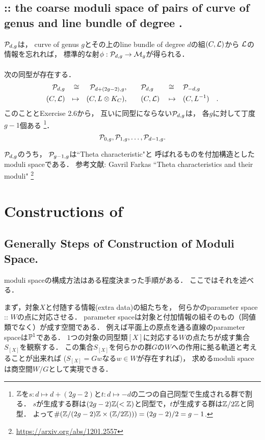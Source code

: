 \documentclass[a4paper]{jsarticle}
\begin{document}
    \subsection{
        :: the coarse moduli space of pairs of curve of genus  and line bundle of degree . }
    $\mathcal{P}_{d,g}$は，
    curve of genus $g$とその上のline bundle of degree $d$の組$(C, \mathcal{L})$から
    $\mathcal{L}$の情報を忘れれば，
    標準的な射$\phi: \mathcal{P}_{d,g} \to \mathcal{M}_g$が得られる．

    \paragraph{}
    次の同型が存在する．
    \[
    \begin{aligned}
        \mathcal{P}_{d,g}& &\cong& &\mathcal{P}_{d+(2g-2), g},&
        && \quad
        \mathcal{P}_{d,g}& &\cong& &\mathcal{P}_{-d, g}& \\
        (C, \mathcal{L})& &\mapsto& &(C, L \otimes K_C),&
        && \quad
        (C, \mathcal{L})& &\mapsto& &(C, L^{-1})&.
    \end{aligned}
    \]
    このこととExercise 2.6から，
    互いに同型にならない$\mathcal{P}_{d,g}$は，
    各$g$に対して丁度$g-1$個ある
    \footnote
    {
        $\mathbb{Z}$を$s: d \mapsto d+(2g-2)$と$t: d \mapsto -d$の二つの自己同型で生成される群で割る．
        $s$が生成する群は$(2g-2)\mathbb{Z} (< \mathbb{Z})$と同型で，$t$が生成する群は$\mathbb{Z}/2\mathbb{Z}$と同型．
        よって$\#( \mathbb{Z}/(2g-2)\mathbb{Z} \times (\mathbb{Z}/2\mathbb{Z})) )=(2g-2)/2=g-1$.
    }．
    \[ \mathcal{P}_{0,g}, \mathcal{P}_{1,g}, \dots, \mathcal{P}_{d-1,g}. \]

    $\mathcal{P}_{d,g}$のうち，
    $\mathcal{P}_{g-1, g}$は``Theta characteristic"と
    呼ばれるものを付加構造としたmoduli spaceである．
    参考文献:
    Gavril Farkas
    ``Theta characteristics and their moduli"
    \footnote{\url{https://arxiv.org/abs/1201.2557}}
    
\section{Constructions of }

    \subsection{Generally Steps of Construction of Moduli Space.}
    moduli spaceの構成方法はある程度決まった手順がある．
    ここではそれを述べる．

    まず，対象$X$と付随する情報(extra data)の組たちを，
    何らかのparameter space :: $W$の点に対応させる．
    parameter spaceは対象と付加情報の組そのもの（同値類でなく）が成す空間である．
    例えば平面上の原点を通る直線のparameter spaceは$\mathbb{P}^1$である．
    $1$つの対象の同型類$[X]$に対応する$W$の点たちが成す集合$S_{[X]}$を観察する．
    この集合$S_{[X]}$を何らかの群$G$の$W$への作用に拠る軌道と考えることが出来れば
    ($S_{[X]}=Gw$なる$w \in W$が存在すれば)，
    求めるmoduli spaceは商空間$W/G$として実現できる．
\end{document}
